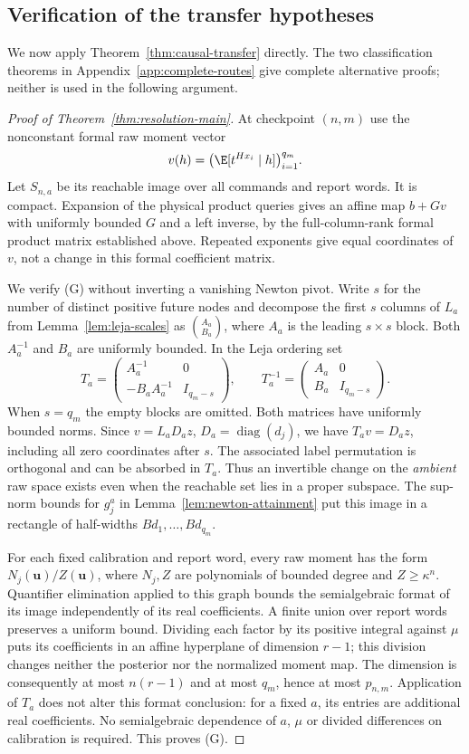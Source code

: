 \subsection{Verification of the transfer hypotheses}
\label{sec:transfer-application}
We now apply Theorem~\ref{thm:causal-transfer} directly. The two
classification theorems in Appendix~\ref{app:complete-routes} give
complete alternative proofs; neither is used in the following argument.

\begin{proof}[Proof of Theorem~\ref{thm:resolution-main}]
At checkpoint $(n,m)$ use the nonconstant formal raw moment vector
\[
 v(h)=\bigl(\E[t^{Hx_i}\mid h]\bigr)_{i=1}^{q_m}.
\]
Let $S_{n,a}$ be its reachable image over all commands and report words.
It is compact. Expansion of the physical product queries gives an
affine map $b+Gv$ with uniformly bounded $G$ and a left inverse, by
the full-column-rank formal product matrix established above. Repeated
exponents give equal coordinates of $v$, not a change in this formal
coefficient matrix.

We verify (G) without inverting a vanishing Newton pivot. Write
$s$ for the number of distinct positive future nodes and decompose the
first $s$ columns of $L_a$ from Lemma~\ref{lem:leja-scales} as
$\binom{A_a}{B_a}$, where $A_a$ is the leading $s\times s$ block.
Both $A_a^{-1}$ and $B_a$ are uniformly bounded. In the Leja ordering set
\[
 T_a=\begin{pmatrix}
       A_a^{-1}&0\\-B_aA_a^{-1}&I_{q_m-s}
     \end{pmatrix},\qquad
 T_a^{-1}=\begin{pmatrix}A_a&0\\B_a&I_{q_m-s}\end{pmatrix}.
\]
When $s=q_m$ the empty blocks are omitted. Both matrices have uniformly
bounded norms. Since $v=L_aD_az$, $D_a=\operatorname{diag}(d_j)$,
we have $T_av=D_az$, including all zero coordinates after $s$.
The associated label permutation is orthogonal and can be absorbed in
$T_a$. Thus an invertible change on the \emph{ambient} raw space exists
even when the reachable set lies in a proper subspace. The sup-norm
bounds for $g_j^a$ in Lemma~\ref{lem:newton-attainment} put this image
in a rectangle of half-widths $B d_1,\ldots,B d_{q_m}$.

For each fixed calibration and report word, every raw moment has the
form $N_j(\boldsymbol u)/Z(\boldsymbol u)$, where $N_j,Z$ are
polynomials of bounded degree and $Z\ge\kappa^n$. Quantifier
elimination applied to this graph bounds the semialgebraic format of
its image independently of its real coefficients. A finite union over
report words preserves a uniform bound. Dividing each factor by its
positive integral against $\mu$ puts its coefficients in an affine
hyperplane of dimension $r-1$; this division changes neither the
posterior nor the normalized moment map. The dimension is consequently
at most $n(r-1)$ and at most $q_m$, hence at most $p_{n,m}$.
Application of $T_a$ does not alter this format conclusion: for a fixed
$a$, its entries are additional real coefficients. No semialgebraic
dependence of $a$, $\mu$ or divided differences on calibration is
required. This proves (G).


\end{proof}
